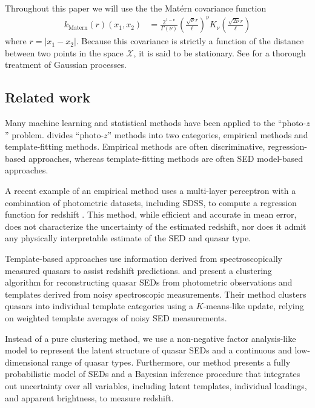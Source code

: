 \documentclass{article}
\newcommand{\mcX}{\mathcal{X}}
\begin{document}
Throughout this paper we will use the the Mat\'{e}rn \cite{Matern1986spatial} covariance function
\begin{align}
  k_{\text{Matern}}(r)(x_1, x_2) 
    &= \frac{2^{1-\nu}}{\Gamma(\nu)} 
       \left( \frac{\sqrt{\nu} r}{\ell} \right) ^\nu
       K_\nu\left( \frac{\sqrt{2\nu} r}{\ell}\right)
\end{align}
where $r = |x_1 - x_2|$.  Because this covariance is strictly a function of the distance between two points in the space $\mcX$, it is said to be stationary. 
See \cite{rasmussen2006gaussian} for a thorough treatment of Gaussian processes.  

\subsection{Related work}
Many machine learning and statistical methods have been applied to the ``photo-$z$'' problem. 
\citet{walcher2011fitting} divides ``photo-$z$'' methods into two categories, empirical methods and template-fitting methods.  Empirical methods are often discriminative, regression-based approaches, whereas template-fitting methods are often SED model-based approaches.  

A recent example of an empirical method uses a multi-layer perceptron with a combination of photometric datasets, including SDSS, 
to compute a regression function for redshift \cite{brescia2013photometric}. 
This method, while efficient and accurate in mean error, does not characterize the uncertainty of the estimated redshift, nor does it admit any physically interpretable estimate of the SED and quasar type.  

Template-based approaches use information derived from spectroscopically measured quasars to assist redshift predictions.  
\citet{budavari2001photometric} and \citet{richards2001photometric} present a clustering algorithm for reconstructing quasar SEDs from photometric observations and templates derived from noisy spectroscopic measurements.  
Their method clusters quasars into individual template categories using a $K$-means-like update, relying on weighted template averages of noisy SED measurements.  

Instead of a pure clustering method, we use a non-negative factor analysis-like model to represent the latent structure of quasar SEDs and a continuous and low-dimensional range of quasar types.  
Furthermore, our method presents a fully probabilistic model of SEDs and a Bayesian inference procedure that integrates out uncertainty over all variables, including  latent templates, individual loadings, and apparent brightness, to measure redshift.    
\end{document}
